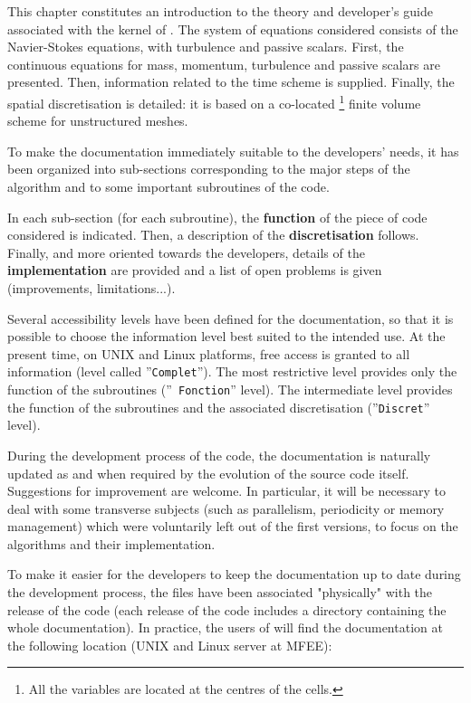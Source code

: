 This chapter constitutes an introduction to the theory and developer's guide
associated with the kernel of \CS.
The system of equations considered consists of the
Navier-Stokes equations, with turbulence and passive scalars. First, the
continuous equations for mass, momentum, turbulence and passive scalars are
presented. Then, information related to the time scheme is supplied.
Finally, the spatial discretisation is detailed: it is based on a co-located%
\footnote{%
All the variables are located at the centres of the cells.} finite volume
scheme for unstructured meshes.

To make the documentation immediately suitable to the developers' needs, it
has been organized into sub-sections corresponding to the major steps of the
algorithm and to some important subroutines of the code.

In each sub-section (for each subroutine), the \textbf{function} of the
piece of code considered is indicated. Then, a description of the \textbf{%
discretisation} follows. Finally, and more oriented towards the developers,
details of the \textbf{implementation} are provided and a list of open
problems is given (improvements, limitations...).

Several accessibility levels have been defined for the documentation, so
that it is possible to choose the information level best suited to the
intended use. At the present time, on UNIX and Linux platforms, free access
is granted to all information (level called ''\texttt{Complet}''). The most
restrictive level provides only the function of the subroutines (''\texttt{%
Fonction}'' level). The intermediate level provides the function of the
subroutines and the associated discretisation (''\texttt{Discret}'' level).

During the development process of the code, the documentation is naturally
updated as and when required by the evolution of the source code itself.
Suggestions for improvement are welcome. In particular, it will be necessary
to deal with some transverse subjects (such as parallelism, periodicity or
memory management) which were voluntarily left out of the first versions, to
focus on the algorithms and their implementation.

To make it easier for the developers to keep the documentation up to date
during the development process, the files have been associated "physically"
with the release of the code (each release of the code includes a directory
containing the whole documentation). In practice,
the users of \CS will find the documentation at the following location
(UNIX and Linux server at MFEE): %

